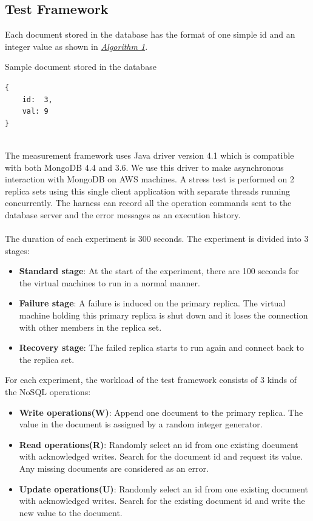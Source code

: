 \documentclass[12pt]{article}
\begin{document}
\subsection{Test Framework}
Each document stored in the database has the format of one simple id and an integer value as shown in \hyperref[alg:doc]{\textit{Algorithm 1}}.
\begin{algorithm}
\caption{Sample document stored in the database}
\begin{verbatim}
{
    id:  3,
    val: 9
}
\end{verbatim}
\label{alg:doc}
\end{algorithm}
\\
The measurement framework uses Java driver version 4.1 which is compatible with both MongoDB 4.4 and 3.6. We use this driver to make asynchronous interaction with MongoDB on AWS machines. A stress test is performed on 2 replica sets using this single client application with separate threads running concurrently. The harness can record all the operation commands sent to the database server and the error messages as an execution history.\\
\\
The duration of each experiment is 300 seconds. The experiment is divided into 3 stages:\\
\begin{itemize}
  \item \textbf{Standard stage}: At the start of the experiment, there are 100 seconds for the virtual machines to run in a normal manner.
  \item \textbf{Failure stage}: A failure is induced on the primary replica. The virtual machine holding this primary replica is shut down and it loses the connection with other members in the replica set.
  \item \textbf{Recovery stage}: The failed replica starts to run again and connect back to the replica set.
\end{itemize}
For each experiment, the workload of the test framework consists of 3 kinds of the NoSQL operations:\\
\begin{itemize}
  \item \textbf{Write operations(W)}: Append one document to the primary replica. The value in the document is assigned by a random integer generator.
  \item \textbf{Read operations(R)}: Randomly select an id from one existing document with acknowledged writes. Search for the document id and request its value. Any missing documents are considered as an error.
  \item \textbf{Update operations(U)}: Randomly select an id from one existing document with acknowledged writes. Search for the existing document id and write the new value to the document.
\end{itemize}
\end{document}
